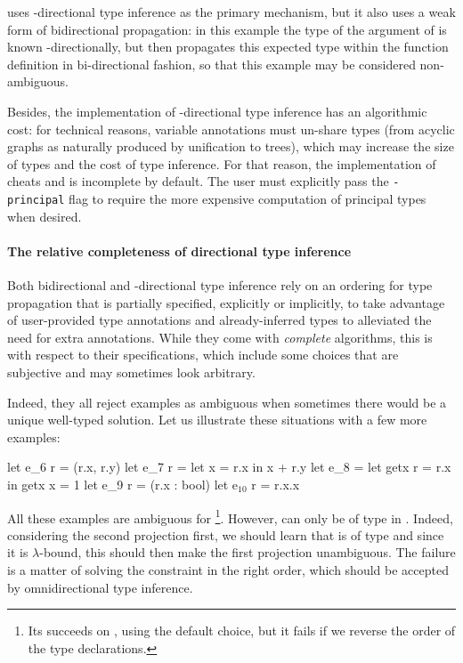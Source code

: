 \documentclass[acmsmall,screen,nonacm,review]{acmart}
\begin{document}
\OCaml uses \geninst-directional type inference as the
primary mechanism, but it also uses a weak form of bidirectional propagation: in this example the type of the argument of  is known \Geninst-directionally, but \OCaml then propagates this expected type within the function definition in bi-directional fashion, so that this example may be considered non-ambiguous.

Besides, the implementation of \geninst-directional type inference has an
algorithmic cost: for technical reasons, variable annotations must un-share
types (from acyclic graphs as naturally produced by unification to trees),
which may increase the size of types and the cost of type inference. For
that reason, the implementation of \OCaml cheats and is incomplete by
default. The user must explicitly pass the \texttt{-principal} flag to
require the more expensive computation of principal types when desired.

\paragraph{The relative completeness of directional type inference}

Both bidirectional and \geninst-directional type inference rely on an
ordering for type propagation that is partially specified, explicitly or
implicitly, to take advantage of user-provided type annotations and
already-inferred types to alleviated the need for extra annotations.
%
While they come with \emph{complete} algorithms, this is with respect to
their specifications, which include some choices that are subjective and may
sometimes look arbitrary.

\locallabelreset

Indeed, they all reject examples as ambiguous when sometimes there
would be a unique well-typed solution. 
%
Let us illustrate these situations with a few more examples:
\begin{program}[error]
let e_6 r = (r.x, r.y)
let e_7 r = let x = r.x in x + r.y
let e_8 = let getx r = r.x in getx {x = 1}
let e_9 r = (r.x : bool)
let e$_{10}$ r = r.x.x
\end{program}
All these examples are ambiguous for \OCaml\footnote{Its succeeds on ,
using the default choice, but it fails if we reverse the order of the type
declarations.}.  However,  can only be of type
 in . Indeed, considering the second projection first,
we should learn that  is of type  and since it is
$\lambda$-bound, this should then make the first projection unambiguous.
The failure is a matter of solving the constraint in the right order, which
should be accepted by omnidirectional type inference.
\end{document}

